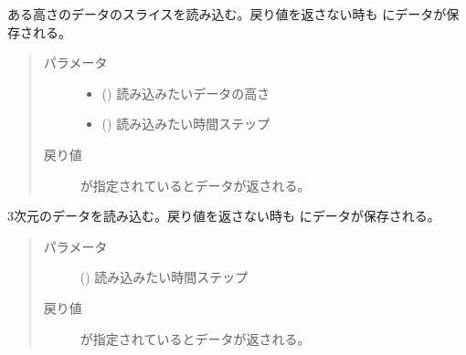 \documentclass[letterpaper,10pt,dvipdfmx,report]{sphinxmanual}
\begin{document}
\begin{fulllineitems}
\label{\detokenize{io:R2D2.read_qq_select}}
ある高さのデータのスライスを読み込む。戻り値を返さない時も  にデータが保存される。
\begin{quote}\begin{description}
\item[{パラメータ}] \leavevmode\begin{itemize}
\item {} 
 () \sphinxhyphen{}\sphinxhyphen{} 読み込みたいデータの高さ

\item {} 
 () \sphinxhyphen{}\sphinxhyphen{} 読み込みたい時間ステップ

\end{itemize}

\item[{戻り値}] \leavevmode
{} が指定されているとデータが返される。

\end{description}\end{quote}

\end{fulllineitems}


\begin{fulllineitems}
\label{\detokenize{io:R2D2.read_qq}}
3次元のデータを読み込む。戻り値を返さない時も  にデータが保存される。
\begin{quote}\begin{description}
\item[{パラメータ}] \leavevmode
{} () \sphinxhyphen{}\sphinxhyphen{} 読み込みたい時間ステップ

\item[{戻り値}] \leavevmode
{} が指定されているとデータが返される。

\end{description}\end{quote}

\end{fulllineitems}
\end{document}
